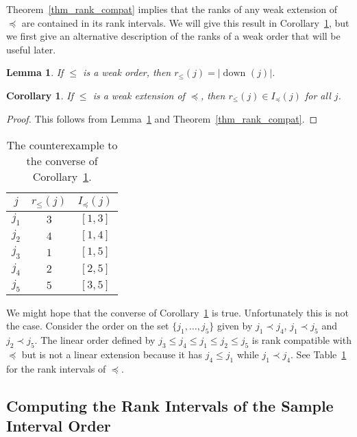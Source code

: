 \documentclass[12pt]{article}
\newcommand{\dset}[2][]{\operatorname{down}_{#1}(#2)}
\numberwithin{theorem}{section}
\newtheorem{lemma}[theorem]{Lemma}
\newtheorem{corollary}[theorem]{Corollary}
\begin{document}
Theorem~\ref{thm_rank_compat} implies that the ranks of any weak extension of $\preceq$ are contained in its rank intervals.  We will give this result in Corollary~\ref{cor_weak_ord_rank_compat}, but we first give an alternative description of the ranks of a weak order that will be useful later.

\begin{lemma}
\label{lem_weak_rank_dset}
If $\leqslant$ is a weak order, then $r_\leqslant(j) = |\dset{j}|$.
\end{lemma}

\begin{corollary}
\label{cor_weak_ord_rank_compat}
If $\leqslant$ is a weak extension of $\preceq$, then $r_\leqslant(j) \in I_\preceq(j)$ for all $j$.
\end{corollary}
\begin{proof}
This follows from Lemma~\ref{lem_weak_rank_dset} and Theorem~\ref{thm_rank_compat}.
\end{proof}

\begin{table}[t]
\centering
\begin{tabular}{|c|c|c|}
\hline
$j$&$r_\leqslant(j)$&$I_\preceq(j)$\\
\hline
$j_1$&$3$&$[1, 3]$\\
$j_2$&$4$&$[1, 4]$\\
$j_3$&$1$&$[1, 5]$\\
$j_4$&$2$&$[2, 5]$\\
$j_5$&$5$&$[3, 5]$\\
\hline
\end{tabular}
\caption{The counterexample to the converse of Corollary~\ref{cor_weak_ord_rank_compat}.}
\label{tab_rank_int_counter}
\end{table}

We might hope that the converse of Corollary~\ref{cor_weak_ord_rank_compat} is true.  Unfortunately this is not the case.  Consider the order on the set $\{j_1, \dots, j_5\}$ given by $j_1 \prec j_4$, $j_1 \prec j_5$ and $j_2 \prec j_5$.  The linear order defined by $j_3 \leqslant j_4 \leqslant j_1 \leqslant j_2 \leqslant j_5$ is rank compatible with $\preceq$ but is not a linear extension because it has $j_4 \leqslant j_1$ while $j_1 \prec j_4$.  See Table~\ref{tab_rank_int_counter} for the rank intervals of $\preceq$.

\subsection{Computing the Rank Intervals of the Sample Interval Order}
\end{document}
